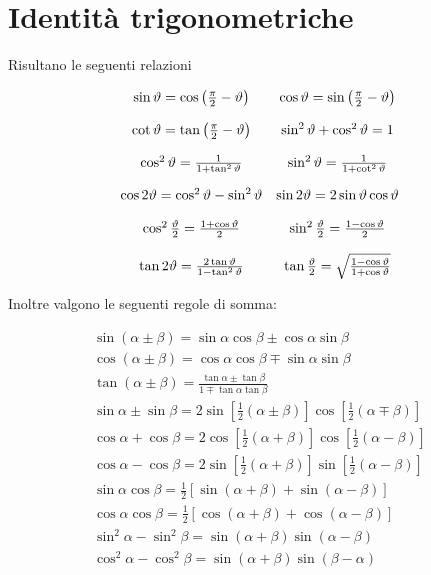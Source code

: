 \documentclass[10pt,a4paper]{book}
\begin{document}
\section*{Identità trigonometriche}

Risultano le seguenti relazioni

\begin{equation*}
	\begin{array}{ c c }
		\sin \vartheta =\cos\left(\frac{\pi }{2} -\vartheta \right) & \cos \vartheta =\sin\left(\frac{\pi }{2} -\vartheta \right)\\
		[4mm]
		\cot \vartheta =\tan\left(\frac{\pi }{2} -\vartheta \right) & \sin^2 \vartheta +\cos^2 \vartheta =1\\
		[4mm]
		\cos^2 \vartheta =\frac{1}{1+\tan^2 \vartheta } & \sin^2 \vartheta =\frac{1}{1+\cot^2 \vartheta }\\
		[4mm]
		\cos 2\vartheta =\cos^2 \vartheta -\sin^2 \vartheta  & \sin 2\vartheta =2\sin \vartheta \cos \vartheta \\
		[4mm]
		\cos^2\frac{\vartheta }{2} =\frac{1+\cos \vartheta }{2} & \sin^2\frac{\vartheta }{2} =\frac{1-\cos \vartheta }{2}\\
		[4mm]
		\tan 2\vartheta =\frac{2\tan \vartheta }{1-\tan^2 \vartheta } & \tan\frac{\vartheta }{2} =\sqrt{\frac{1-\cos \vartheta }{1+\cos \vartheta }}
	\end{array}
\end{equation*}

Inoltre valgono le seguenti regole di somma:

\begin{equation*}
	\begin{array}{ c }
		\sin( \alpha \pm \beta ) =\sin \alpha \cos \beta \pm \cos \alpha \sin \beta \\
		[4mm]
		\cos( \alpha \pm \beta ) =\cos \alpha \cos \beta \mp \sin \alpha \sin \beta \\
		[4mm]
		\tan( \alpha \pm \beta ) =\frac{\tan \alpha \pm \tan \beta }{1\mp \tan \alpha \tan \beta }\\
		[4mm]
		\sin \alpha \pm \sin \beta =2\sin\left[\frac{1}{2}( \alpha \pm \beta )\right]\cos\left[\frac{1}{2}( \alpha \mp \beta )\right]\\
		[4mm]
		\cos \alpha +\cos \beta =2\cos\left[\frac{1}{2}( \alpha +\beta )\right]\cos\left[\frac{1}{2}( \alpha -\beta )\right]\\
		[4mm]
		\cos \alpha -\cos \beta =2\sin\left[\frac{1}{2}( \alpha +\beta )\right]\sin\left[\frac{1}{2}( \alpha -\beta )\right]\\
		[4mm]
		\sin \alpha \cos \beta =\frac{1}{2}[\sin( \alpha +\beta ) +\sin( \alpha -\beta )]\\
		[4mm]
		\cos \alpha \cos \beta =\frac{1}{2}[\cos( \alpha +\beta ) +\cos( \alpha -\beta )]\\
		[4mm]
		\sin^2 \alpha -\sin^2 \beta =\sin( \alpha +\beta )\sin( \alpha -\beta )\\
		[4mm]
		\cos^2 \alpha -\cos^2 \beta =\sin( \alpha +\beta )\sin( \beta -\alpha )
	\end{array}
\end{equation*}
\end{document}
